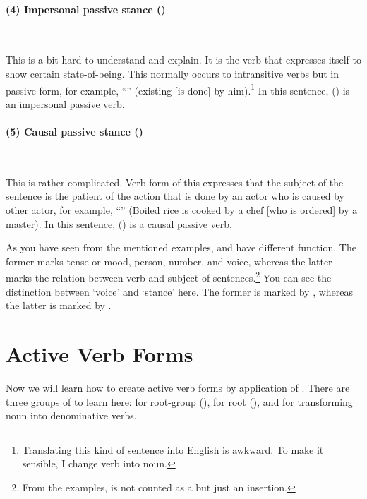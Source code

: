 \paragraph*{(4) Impersonal passive stance ()} \ \par
This is a bit hard to understand and explain. It is the verb that expresses itself to show certain state-of-being. This normally occurs to intransitive verbs but in passive form, for example, ``'' (existing [is done] by him).\footnote{Translating this kind of sentence into English is awkward. To make it sensible, I change verb into noun.} In this sentence,  () is an impersonal passive verb.

\paragraph*{(5) Causal passive stance ()} \ \par
This is rather complicated. Verb form of this expresses that the subject of the sentence is the patient of the action that is done by an actor who is caused by other actor, for example, ``'' (Boiled rice is cooked by a chef [who is ordered] by a master). In this sentence,  () is a causal passive verb.

\bigskip
As you have seen from the mentioned examples,  and  have different function. The former marks tense or mood, person, number, and voice, whereas the latter marks the relation between verb and subject of sentences.\footnote{From the examples,  is not counted as a  but just an insertion.} You can see the distinction between `voice' and `stance' here. The former is marked by , whereas the latter is marked by .

{}
\section*{Active Verb Forms}

Now we will learn how to create active verb forms by application of . There are three groups of  to learn here: for root-group (), for root (), and for transforming noun into denominative verbs.

